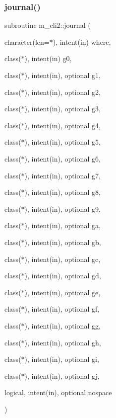 \subsubsection{\texorpdfstring{journal()}{journal()}}
{\footnotesize\ttfamily subroutine m\+\_\+cli2\+::journal (\begin{DoxyParamCaption}\item[{character(len=$\ast$), intent(in)}]{where,  }\item[{class($\ast$), intent(in)}]{g0,  }\item[{class($\ast$), intent(in), optional}]{g1,  }\item[{class($\ast$), intent(in), optional}]{g2,  }\item[{class($\ast$), intent(in), optional}]{g3,  }\item[{class($\ast$), intent(in), optional}]{g4,  }\item[{class($\ast$), intent(in), optional}]{g5,  }\item[{class($\ast$), intent(in), optional}]{g6,  }\item[{class($\ast$), intent(in), optional}]{g7,  }\item[{class($\ast$), intent(in), optional}]{g8,  }\item[{class($\ast$), intent(in), optional}]{g9,  }\item[{class($\ast$), intent(in), optional}]{ga,  }\item[{class($\ast$), intent(in), optional}]{gb,  }\item[{class($\ast$), intent(in), optional}]{gc,  }\item[{class($\ast$), intent(in), optional}]{gd,  }\item[{class($\ast$), intent(in), optional}]{ge,  }\item[{class($\ast$), intent(in), optional}]{gf,  }\item[{class($\ast$), intent(in), optional}]{gg,  }\item[{class($\ast$), intent(in), optional}]{gh,  }\item[{class($\ast$), intent(in), optional}]{gi,  }\item[{class($\ast$), intent(in), optional}]{gj,  }\item[{logical, intent(in), optional}]{nospace }\end{DoxyParamCaption})\hspace{0.3cm}{\ttfamily [private]}}

